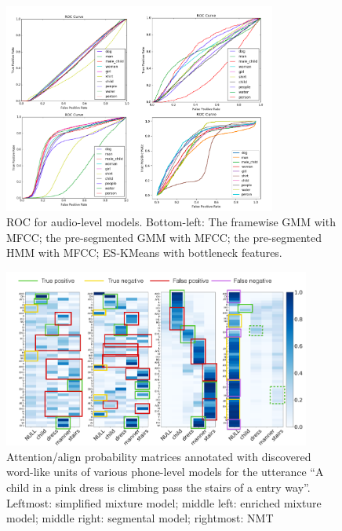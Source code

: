 \documentclass[journal]{IEEEtran}
\begin{document}
\begin{figure}[t]
    \centering
    \includegraphics[width=0.8\textwidth]{fig_4.png}
    \caption{ROC for audio-level models. Bottom-left: The framewise GMM with MFCC; the pre-segmented GMM with MFCC; the pre-segmented HMM with MFCC; ES-KMeans with bottleneck features.}
    \label{fig:roc_audio}
\end{figure}

\begin{figure}[t]
    \centering
    \includegraphics[width=0.9\textwidth]{fig_8.png}
    \caption{Attention/align probability matrices annotated with discovered word-like units of various phone-level models for the utterance ``A child in a pink dress is climbing pass the stairs of a entry way''. Leftmost: simplified mixture model; middle left: enriched mixture model; middle right: segmental model; rightmost: NMT}
    \label{fig:attention_plots}
\end{figure}
\end{document}
